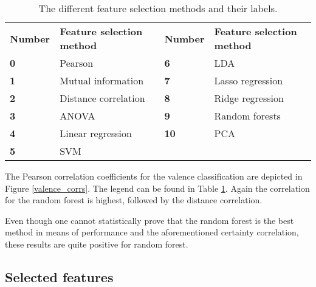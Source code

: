 \begin{table}[H]
\centering
\begin{tabular}{ll|ll}
\textbf{Number} & \textbf{Feature selection method} & \textbf{Number} & \textbf{Feature selection method} \\
\textbf{0}      & Pearson                           & \textbf{6}      & LDA                      \\
\textbf{1}      & Mutual information                & \textbf{7}      & Lasso regression         \\
\textbf{2}      & Distance correlation              & \textbf{8}      & Ridge regression         \\
\textbf{3}      & ANOVA                             & \textbf{9}      & Random forests           \\
\textbf{4}      & Linear regression                 & \textbf{10}     & PCA                      \\
\textbf{5}      & SVM                      &        &                         
\end{tabular}
\caption{The different feature selection methods and their labels\label{corrsCompLbl}.}
\end{table}


The Pearson correlation coefficients for the valence classification are depicted in Figure \ref{valence_corrs}. The legend can be found in Table \ref{corrsCompLbl}. Again the correlation for the random forest is highest, followed by the distance correlation.


Even though one cannot statistically prove that the random forest is the best method in means of performance and the aforementioned certainty correlation, these results are quite positive for random forest. 

\subsection{Selected features}

